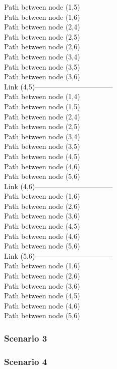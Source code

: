 Path between node (1,5)\\
Path between node (1,6)\\
Path between node (2,4)\\
Path between node (2,5)\\
Path between node (2,6)\\
Path between node (3,4)\\
Path between node (3,5)\\
Path between node (3,6)\\
Link (4,5)---------------------------------\\
Path between node (1,4)\\
Path between node (1,5)\\
Path between node (2,4)\\
Path between node (2,5)\\
Path between node (3,4)\\
Path between node (3,5)\\
Path between node (4,5)\\
Path between node (4,6)\\
Path between node (5,6)\\
Link (4,6)---------------------------------\\
Path between node (1,6)\\
Path between node (2,6)\\
Path between node (3,6)\\
Path between node (4,5)\\
Path between node (4,6)\\
Path between node (5,6)\\
Link (5,6)---------------------------------\\
Path between node (1,6)\\
Path between node (2,6)\\
Path between node (3,6)\\
Path between node (4,5)\\
Path between node (4,6)\\
Path between node (5,6)\\


\subsubsection{Scenario 3}



\subsubsection{Scenario 4}



